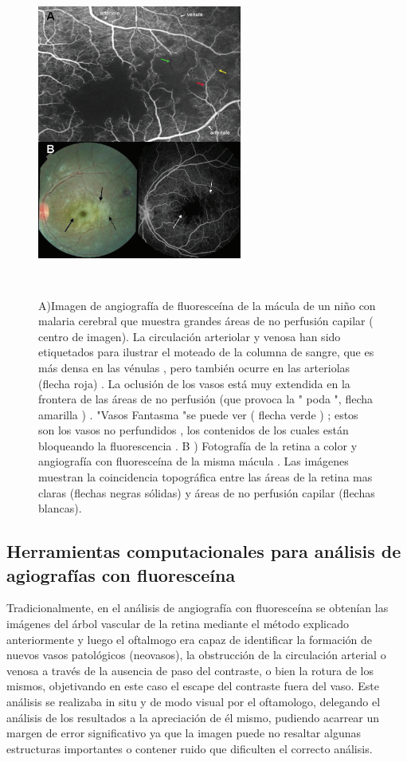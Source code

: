 \begin{figure}[H]
\centering
\includegraphics[height=10cm,width=0.6\textwidth]{./Figures/FA_MALARIA.png}
\label{fig:lightfilter}
\caption{A)Imagen de angiografía de fluoresceína  de la mácula de un niño con malaria cerebral que muestra grandes áreas de no perfusión capilar ( centro de imagen). La circulación arteriolar y venosa han sido etiquetados para ilustrar el moteado de la columna de sangre, que es más densa en las vénulas , pero también ocurre en las arteriolas (flecha roja) . La oclusión de los vasos está muy extendida en la frontera de las áreas de no perfusión (que provoca la " poda ", flecha amarilla ) . "Vasos Fantasma "se puede ver ( flecha verde ) ; estos son los vasos no perfundidos , los contenidos de los cuales están bloqueando la fluorescencia . B ) Fotografía de la retina a color y angiografía con fluoresceína de la misma mácula . Las imágenes muestran la coincidencia topográfica entre las áreas de la retina mas claras (flechas negras sólidas) y áreas de no perfusión capilar (flechas blancas). }
\end{figure}

	\subsection{Herramientas computacionales para an\'alisis de agiograf\'ias con fluoresce\'ina}


Tradicionalmente, en el análisis de  angiografía con fluoresceína  se obtenían las imágenes del árbol vascular de la retina mediante  el método explicado anteriormente y luego  el oftalmogo era capaz de identificar la formación de nuevos vasos patológicos (neovasos), la obstrucción de la circulación arterial o venosa a través de la ausencia de paso del contraste, o bien la rotura de los mismos, objetivando en este caso el escape del contraste fuera del vaso. Este análisis se realizaba in situ y de modo visual por el oftamologo, delegando el análisis de los resultados a la apreciación de él mismo, pudiendo acarrear un margen de error significativo ya que la imagen puede no resaltar algunas estructuras importantes o contener ruido que dificulten el correcto análisis.

